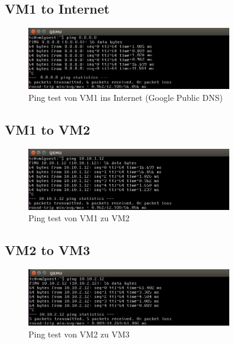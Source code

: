 \documentclass[a4,12pt]{scrartcl}
\begin{document}
\subsection{VM1 to Internet}
\begin{figure} [H]
	\begin{center}
	\includegraphics[width=0.80\textwidth]{./pictures/ping_vm1_to_internet.png}
	\caption{{Ping test von VM1 ins Internet (Google Public DNS)}}
	\label{virtualdir}
	\end{center}
\end{figure}

\subsection{VM1 to VM2}
\begin{figure} [H]
	\begin{center}
	\includegraphics[width=0.80\textwidth]{./pictures/ping_vm1_to_vm2.png}
	\caption{{Ping test von VM1 zu VM2}}
	\label{virtualdir}
	\end{center}
\end{figure}

\subsection{VM2 to VM3}
\begin{figure} [H]
	\begin{center}
	\includegraphics[width=0.80\textwidth]{./pictures/ping_vm2_to_vm3.png}
	\caption{{Ping test von VM2 zu VM3}}
	\label{virtualdir}
	\end{center}
\end{figure}
\newpage
\end{document}
